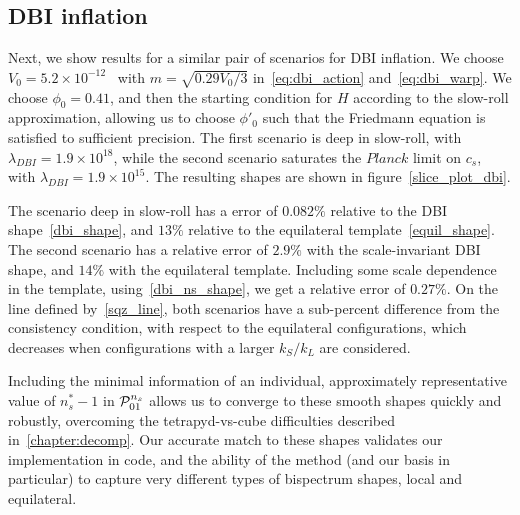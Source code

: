 \subsection{DBI inflation}
Next, we show results for a similar pair of scenarios for DBI inflation.
We choose $V_{0}={5.2\times10^{-12}}$~%
with $m=\sqrt{0.29V_0/3}$
in~\eqref{eq:dbi_action} and~\eqref{eq:dbi_warp}.
We choose $\phi_0=0.41$, and then the starting condition
for $H$ according to the slow-roll approximation,
allowing us to choose $\phi'_0$ such that the Friedmann
equation is satisfied to sufficient precision.
The first scenario is deep in slow-roll, with $\lambda_{DBI}=1.9\times10^{18}$, while
the second scenario saturates the $\textit{Planck}$
limit on $c_s$, with $\lambda_{DBI}=1.9\times10^{15}$.
The resulting shapes are shown in figure~\ref{slice_plot_dbi}.


The scenario deep in slow-roll has a error of $0.082\%$
relative to the DBI shape~\eqref{dbi_shape},
and $13\%$
relative to the equilateral template~\eqref{equil_shape}.
The second scenario has a relative error of $2.9\%$
with the scale-invariant DBI shape, and $14\%$ with the equilateral template.
Including some scale dependence in the template,
using~\eqref{dbi_ns_shape}, we get a relative error of $0.27\%$.
On the line defined by~\eqref{sqz_line},
both scenarios have a sub-percent difference from the
consistency condition, with respect to the equilateral configurations,
which decreases when configurations with a larger $k_S/k_L$ are considered.

Including the minimal information of an individual, approximately
representative value of $n_s^{*}-1$
in $\mathcal{P}^{n_s}_{01}$ allows us to converge to these smooth shapes quickly
and robustly, overcoming the tetrapyd-vs-cube difficulties described
in~\ref{chapter:decomp}. Our accurate match to these shapes validates our
implementation in code, and the ability of the method
(and our basis in particular) to capture very different types of
bispectrum shapes, local and equilateral.


